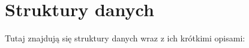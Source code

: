 \section{Struktury danych}
Tutaj znajdują się struktury danych wraz z ich krótkimi opisami\+:\begin{DoxyCompactList}
\item{}
\end{DoxyCompactList}
